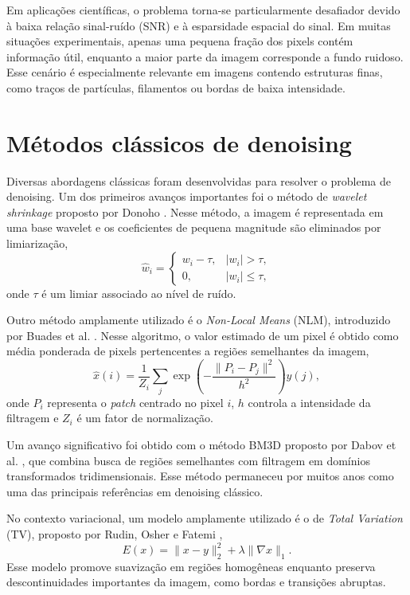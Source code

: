 \documentclass[
        oneside,      %
        english,			
        brazil			 
        ]{abntbibufjf}
\begin{document}
Em aplicações científicas, o problema torna-se particularmente desafiador devido à baixa relação sinal-ruído (SNR) e à esparsidade espacial do sinal. Em muitas situações experimentais, apenas uma pequena fração dos pixels contém informação útil, enquanto a maior parte da imagem corresponde a fundo ruidoso. Esse cenário é especialmente relevante em imagens contendo estruturas finas, como traços de partículas, filamentos ou bordas de baixa intensidade.

\section{Métodos clássicos de denoising}

Diversas abordagens clássicas foram desenvolvidas para resolver o problema de denoising. Um dos primeiros avanços importantes foi o método de \textit{wavelet shrinkage} proposto por Donoho \cite{donoho1995denoising}. Nesse método, a imagem é representada em uma base wavelet e os coeficientes de pequena magnitude são eliminados por limiarização,
\begin{equation}
\hat{w}_i =
\begin{cases}
w_i - \tau, & |w_i| > \tau,\\
0, & |w_i| \le \tau,
\end{cases}
\end{equation}
onde $\tau$ é um limiar associado ao nível de ruído.

Outro método amplamente utilizado é o \textit{Non-Local Means} (NLM), introduzido por Buades et al. \cite{buades2005nonlocal}. Nesse algoritmo, o valor estimado de um pixel é obtido como média ponderada de pixels pertencentes a regiões semelhantes da imagem,
\begin{equation}
\hat{x}(i)
=
\frac{1}{Z_i}
\sum_j
\exp
\left(
-\frac{\|P_i-P_j\|^2}{h^2}
\right)
y(j),
\end{equation}
onde $P_i$ representa o \textit{patch} centrado no pixel $i$, $h$ controla a intensidade da filtragem e $Z_i$ é um fator de normalização.

Um avanço significativo foi obtido com o método BM3D proposto por Dabov et al. \cite{dabov2007bm3d}, que combina busca de regiões semelhantes com filtragem em domínios transformados tridimensionais. Esse método permaneceu por muitos anos como uma das principais referências em denoising clássico.

No contexto variacional, um modelo amplamente utilizado é o de \textit{Total Variation} (TV), proposto por Rudin, Osher e Fatemi \cite{rudin1992tv},
\begin{equation}
E(x)
=
\|x-y\|_2^2 + \lambda \|\nabla x\|_1.
\end{equation}
Esse modelo promove suavização em regiões homogêneas enquanto preserva descontinuidades importantes da imagem, como bordas e transições abruptas.
\end{document}
